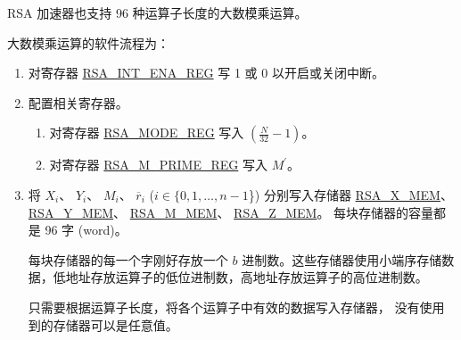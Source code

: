 \documentclass[main\_\_CN.tex]{subfiles}
\begin{document}
RSA 加速器也支持 96 种运算子长度的大数模乘运算。

大数模乘运算的软件流程为：

\begin{enumerate}

    \item 对寄存器 \hyperref[regdesc:RSAINTENAREG]{RSA\_INT\_ENA\_REG} 写 1 或 0 以开启或关闭中断。

    \item 配置相关寄存器。

    \begin{enumerate}
        \item 对寄存器 \hyperref[regdesc:RSAMODEREG]{RSA\_MODE\_REG} 写入 \begin{math}( \frac{N}{32} - 1 )\end{math}。

        \item 对寄存器 \hyperref[regdesc:RSAMPRIMEREG]{RSA\_M\_PRIME\_REG} 写入 \begin{math}M^{\prime}\end{math}。

    \end{enumerate}

    \item 将
        \begin{math}X_{i}\end{math}、
        \begin{math}Y_{i}\end{math}、
        \begin{math}M_{i}\end{math}、
        \begin{math}\overline{r}_{i}\end{math}
        (\begin{math}i \in \{0, 1, \dots, n-1\end{math}\})
        分别写入存储器
        \hyperref[tab:rsa-mem]{RSA\_X\_MEM}、
        \hyperref[tab:rsa-mem]{RSA\_Y\_MEM}、
        \hyperref[tab:rsa-mem]{RSA\_M\_MEM}、
        \hyperref[tab:rsa-mem]{RSA\_Z\_MEM}。
        每块存储器的容量都是 96 字 (word)。

        每块存储器的每一个字刚好存放一个 \begin{math}b\end{math} 进制数。这些存储器使用小端序存储数据，低地址存放运算子的低位进制数，高地址存放运算子的高位进制数。

        只需要根据运算子长度，将各个运算子中有效的数据写入存储器，
        没有使用到的存储器可以是任意值。


\end{enumerate}
\end{document}

